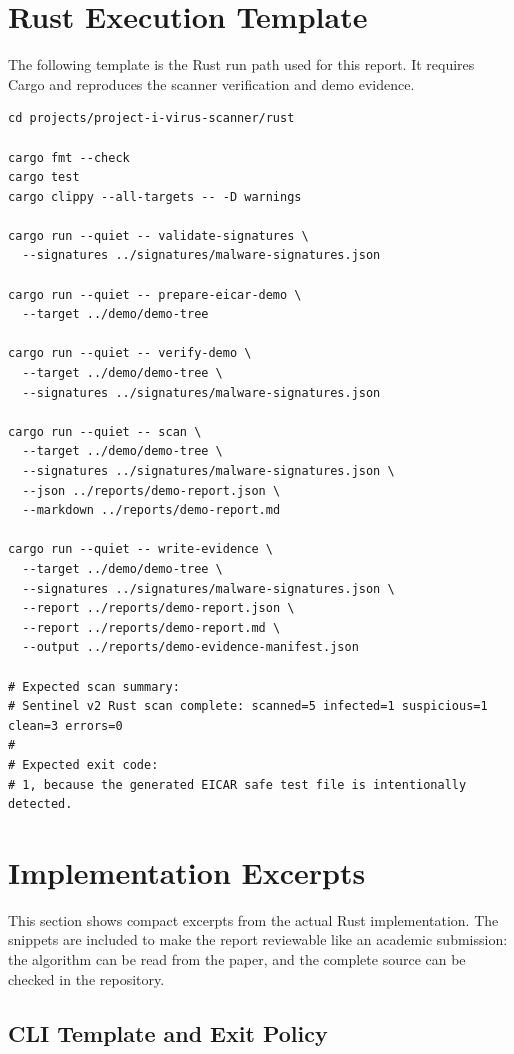 \documentclass[11pt]{article}
\begin{document}
\section{Rust Execution Template}

The following template is the Rust run path used for this report. It requires
Cargo and reproduces the scanner verification and demo evidence.

\begin{lstlisting}[style=sentinel]
cd projects/project-i-virus-scanner/rust

cargo fmt --check
cargo test
cargo clippy --all-targets -- -D warnings

cargo run --quiet -- validate-signatures \
  --signatures ../signatures/malware-signatures.json

cargo run --quiet -- prepare-eicar-demo \
  --target ../demo/demo-tree

cargo run --quiet -- verify-demo \
  --target ../demo/demo-tree \
  --signatures ../signatures/malware-signatures.json

cargo run --quiet -- scan \
  --target ../demo/demo-tree \
  --signatures ../signatures/malware-signatures.json \
  --json ../reports/demo-report.json \
  --markdown ../reports/demo-report.md

cargo run --quiet -- write-evidence \
  --target ../demo/demo-tree \
  --signatures ../signatures/malware-signatures.json \
  --report ../reports/demo-report.json \
  --report ../reports/demo-report.md \
  --output ../reports/demo-evidence-manifest.json

# Expected scan summary:
# Sentinel v2 Rust scan complete: scanned=5 infected=1 suspicious=1 clean=3 errors=0
#
# Expected exit code:
# 1, because the generated EICAR safe test file is intentionally detected.
\end{lstlisting}

\section{Implementation Excerpts}

This section shows compact excerpts from the actual Rust implementation. The
snippets are included to make the report reviewable like an academic submission:
the algorithm can be read from the paper, and the complete source can be
checked in the repository.

\subsection{CLI Template and Exit Policy}
\end{document}
